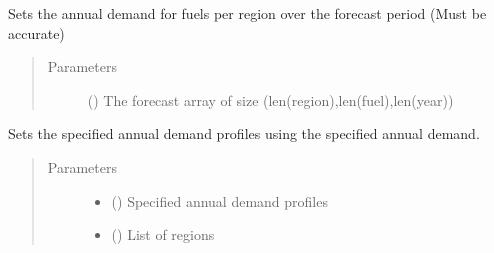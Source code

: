 \documentclass[a4paper,12pt,english]{article}
\begin{document}
\begin{fulllineitems}
\begin{fulllineitems}
\label{\detokenize{GOCPI:GOCPI.CreateCases.CreateCases.set_specified_annual_demand}}
Sets the annual demand for fuels per region over the forecast period (Must be accurate)
\begin{quote}\begin{description}
\item[{Parameters}] \leavevmode
{} (\sphinxstyleliteralemphasis{\sphinxupquote{, }}) \textendash{} The forecast array of size (len(region),len(fuel),len(year))

\end{description}\end{quote}

\end{fulllineitems}


\begin{fulllineitems}
\label{\detokenize{GOCPI:GOCPI.CreateCases.CreateCases.set_specified_demand_profile}}
Sets the specified annual demand profiles using the specified annual demand.
\begin{quote}\begin{description}
\item[{Parameters}] \leavevmode\begin{itemize}
\item {} 
 (\sphinxstyleliteralemphasis{\sphinxupquote{, }}) \textendash{} Specified annual demand profiles

\item {} 
 () \textendash{} List of regions


\end{itemize}
\end{description}
\end{quote}
\end{fulllineitems}
\end{fulllineitems}
\end{document}
